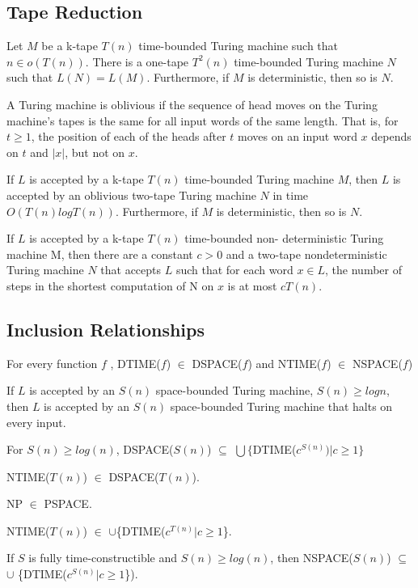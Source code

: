 \subsection{Tape Reduction}

 Let $M$ be a k-tape $T(n)$ time-bounded Turing machine
such that $n \in o(T(n))$. There is a one-tape $T^2(n)$ time-bounded
Turing machine
$N$ such that $L(N) = L(M)$. Furthermore, if $M$ is deterministic, then so is
$N$.

A Turing machine is oblivious if the sequence of head moves on
the
Turing machine's tapes is the same for all input words of the same
length. That is,
for $t \ge 1$, the position of each of the heads after $t$ moves on an
input word $x$ depends on $t$ and $|x|$, but not on $x$.

 If $L$ is accepted by a k-tape $T(n)$ time-bounded
Turing machine $M$, then $L$ is accepted by an oblivious two-tape Turing machine
$N$ in time $O(T(n)logT(n))$. Furthermore, if $M$ is deterministic, then so is
$N$.

 If $L$ is accepted by a k-tape $T(n)$ time-bounded non-
deterministic Turing machine M, then there are a constant $c > 0$ and a two-tape
nondeterministic Turing machine $N$ that accepts $L$ such that for each word
$x \in L$,
the number of steps in the shortest computation of N on $x$ is at most $cT(n)$.

\subsection{Inclusion Relationships}

 For every function $f$ ,
DTIME($f$) $\in$ DSPACE($f$) and NTIME($f$) $\in$ NSPACE($f$)

 If $L$ is accepted by an $S(n)$ space-bounded Turing machine, 
$S(n) \ge log n$, then $L$ is accepted by an $S(n)$ space-bounded
Turing machine that halts on every input.

 For $S(n) \ge log(n)$,
DSPACE($S(n)$) $\subseteq$ $\bigcup \{$DTIME($c^{S(n)}) | c \ge 1 \}$

  NTIME($T(n)$) $\in$ DSPACE($T(n)$).

 NP $\in$ PSPACE.

 NTIME($T(n)$) $\in$ $\cup$\{DTIME($c^{T(n)}| c \ge 1$\}.

 If $S$ is fully time-constructible and $S(n) \ge
log(n)$, then NSPACE($S(n)$) $\subseteq$ $\cup$ \{DTIME($c^{S(n)}|c \ge 1$\}).

